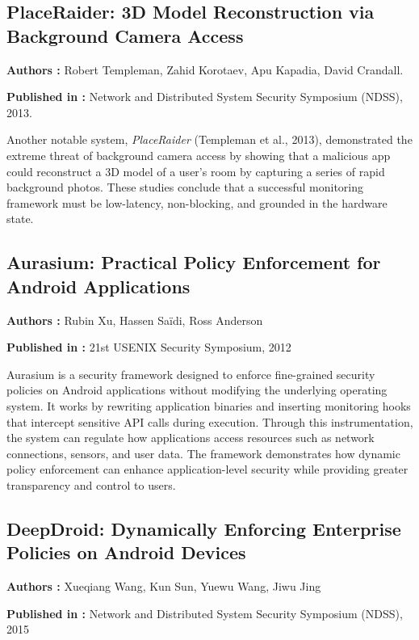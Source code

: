 \documentclass[12pt,a4paper]{report}
\begin{document}
\begin{enumerate}
    \subsection{PlaceRaider: 3D Model Reconstruction via Background Camera Access}

    \textbf{Authors :} Robert Templeman, Zahid Korotaev, Apu Kapadia, David Crandall.

    \textbf{Published in :} Network and Distributed System Security Symposium (NDSS), 2013.

    Another notable system, \textit{PlaceRaider} \cite{placeraider} (Templeman et al., 2013), demonstrated the extreme threat of background camera access by showing that a malicious app could reconstruct a 3D model of a user's room by capturing a series of rapid background photos. These studies conclude that a successful monitoring framework must be low-latency, non-blocking, and grounded in the hardware state.

   \subsection{Aurasium: Practical Policy Enforcement for Android Applications}

\textbf{Authors :} Rubin Xu, Hassen Sa\"{i}di, Ross Anderson

\textbf{Published in :} 21st USENIX Security Symposium, 2012

Aurasium is a security framework designed to enforce fine-grained security
policies on Android applications without modifying the underlying operating
system. It works by rewriting application binaries and inserting monitoring
hooks that intercept sensitive API calls during execution. Through this
instrumentation, the system can regulate how applications access resources
such as network connections, sensors, and user data. The framework
demonstrates how dynamic policy enforcement can enhance application-level
security while providing greater transparency and control to users.
    \subsection{DeepDroid: Dynamically Enforcing Enterprise Policies on Android Devices}

    \textbf{Authors :} Xueqiang Wang, Kun Sun, Yuewu Wang, Jiwu Jing

    \textbf{Published in :} Network and Distributed System Security Symposium (NDSS), 2015


\end{enumerate}
\end{document}
